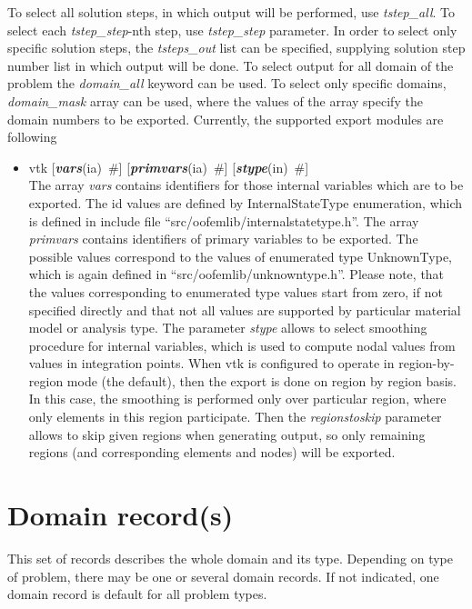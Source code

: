 \documentclass[draft]{article}
\newcommand{\param}[1]{{\em #1}}
\newcommand{\keywordnotype}[1]{\mbox{{\it{\bf{#1}}}}}
\newcommand{\keyword}[2]{\mbox{{\keywordnotype{#1}\tiny (#2)}}}
\newcommand{\field}[2]{\mbox{\keyword{#1}{#2}~\#}}
\newcommand{\optField}[2]{\mbox{[\field{#1}{#2}]}}
\begin{document}
To select all solution steps, in which output will be performed, use
\param{tstep\_all}. To select each \param{tstep\_step}-nth step, use
\param{tstep\_step} parameter. In order to select only specific
solution steps, the \param{tsteps\_out} list can be specified,
supplying solution step number list in which output will be done.
To select output for all domain of the problem the \param{domain\_all}
keyword can be used. To select only specific domains,
\param{domain\_mask} array can be used, where the values of the array
specify the domain numbers to be exported.
Currently, the supported export modules are following
\begin{itemize}
\item vtk \optField{vars}{ia} \optField{primvars}{ia}
\optField{stype}{in} \\
The array \param{vars} contains identifiers for those internal
variables which are to be exported. The id values are defined by
InternalStateType enumeration, which is defined in include file
``src/oofemlib/internalstatetype.h''.
The array \param{primvars}
contains identifiers of primary variables to be exported.
The possible values correspond to the values of enumerated type
UnknownType, which is again defined in ``src/oofemlib/unknowntype.h''.
Please note, that the values corresponding to enumerated type values
start from zero, if not specified directly and that not all values are
supported by particular material model or analysis type.
The parameter \param{stype} allows to select smoothing procedure for
internal variables, which is used to compute nodal values from values
in integration points.
When vtk is configured to operate in region-by-region mode (the default), then the export is done on region by region basis. In this case, the smoothing is performed only over particular region, where only elements in this region participate. Then the \param{regionstoskip} parameter allows to skip given regions when generating output, so only remaining regions (and corresponding elements and nodes) will be exported.
\end{itemize}

\section{Domain record(s)}
\label{_DomainRecord}
This set of records describes the whole domain and its type. Depending
on type of problem, there may be one or several domain records. If not
indicated, one domain record is default for all problem types.
\end{document}
